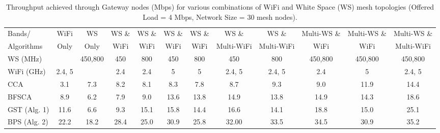 

   \begin{table}[t] 
   \centering %
   \begin{tabular}{|l|c|c|c|c|c|c|c|c|c|c|c|} %
   \hline %
   Bands/     & WiFi    & WS      & WS \& & WS \& &  WS \& & WS \& & WS \&      &  WS \&      & Multi-WS \& & Multi-WS \& & Multi-WS \& \\%
   Algorithms & Only    & Only    & WiFi  & WiFi  &  WiFi  & WiFi  & Multi-WiFi &  Multi-WiFi & WiFi        & WiFi        & Multi-WiFi  \\
	   \hline %
	   WS (MHz)   &							    & 450,800 & 450 &  800  &  450   & 800		 & 450    & 800      & 450,800     & 450,800     & 450,800     \\
		   \hline
		   WiFi (GHz) & 2.4, 5 &								  & 2.4 &  2.4  &  5   & 5		 & 2.4, 5& 2.4, 5	 & 2.4		   & 5         & 2.4, 5     \\ %
		   \hline
		   \hline %
		   CCA~\cite{draves2004routing}			    & 3.1   &  7.3  & 8.2    &8.1    &8.3		 &7.8     &   8.7    &   9.3&     9.0             &         11.9     &   14.4          \\
			   \hline %
			   BFSCA~\cite{ramachandran2006interference}  & 8.9   &  6.2  & 7.9    & 9.0   & 13.6 	 & 13.8   &  14.9    &   13.8&      14.9           &      14.3       &       18.6      \\ 
			   \hline %
			   GST (Alg. 1)								& 11.6  &   6.6 & 9.3    &   15.1&   15.8	 &  14.4  &   16.6   &    14.1  &   18.8            &  15.0           &    25.1         \\
				   \hline %
				   BPS (Alg. 2)								& 22.2  & 18.2  &  28.4  & 25.0  & 30.9 	 & 25.8   &   32.00  &  33.5       &     34.5            &      30.9       &       35.2      \\ 
				   \hline %
				   \end{tabular} 
				   \label{tab:2channelcombination} 
				   \caption{Throughput achieved through Gateway nodes (Mbps) for various combinations of WiFi and White Space (WS) mesh topologies (Offered Load = 4 Mbps, Network Size = 30 mesh nodes).} %
				   \vspace{-0.1in}
				   \end{table} 

